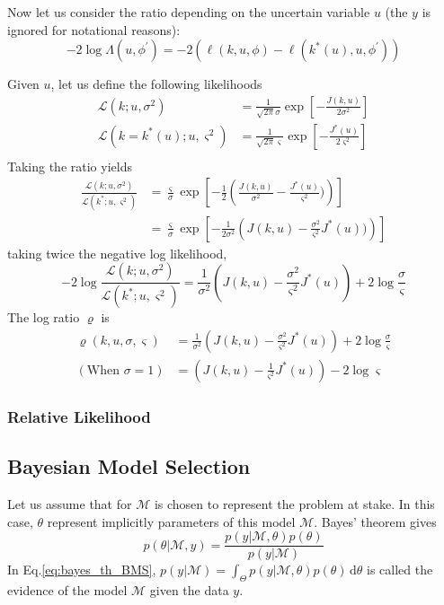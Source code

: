 \documentclass[a4paper,11pt]{article}
\theoremstyle{defi}
\numberwithin{thmCounter}{section}
\begin{document}
Now let us consider the ratio depending on the uncertain variable $u$ (the $y$ is ignored for notational reasons):
\begin{equation}
  -2\log\Lambda(u, \phi^\prime) = -2\left(\ell(k, u, \phi) - \ell(k^*(u), u, \phi^\prime) \right)
\end{equation}

Given $u$, let us define the following likelihoods
\begin{align}
  \mathcal{L}(k ; u, \sigma^2) &= \frac{1}{\sqrt{2\pi}\sigma}\exp\left[-\frac{J(k,u)}{2\sigma^2}\right] \\
  \mathcal{L}(k=k^*(u) ; u, \varsigma^2) &= \frac{1}{\sqrt{2\pi}\varsigma}\exp\left[-\frac{J^*(u)}{2\varsigma^2}\right] \\
\end{align}
Taking the ratio yields
\begin{align}
  \frac{\mathcal{L}(k;u,\sigma^2)}{\mathcal{L}(k^*;u,\varsigma^2)} &= \frac{\varsigma}{\sigma}\exp\left[-\frac{1}{2}\left(\frac{J(k,u)}{\sigma^2} - \frac{J^*(u)}{\varsigma^2})\right)\right] \\
                                                                   &= \frac{\varsigma}{\sigma}\exp\left[-\frac{1}{2\sigma^2}\left(J(k,u)- \frac{\sigma^2}{\varsigma^2}J^*(u))\right)\right]
\end{align}
taking twice the negative log likelihood,
\begin{equation}
  -2\log \frac{\mathcal{L}(k;u,\sigma^2)}{\mathcal{L}(k^*;u,\varsigma^2)} = \frac{1}{\sigma^2}\left(J(k,u) - \frac{\sigma^2}{\varsigma^2}J^*(u)\right) +2\log\frac{\sigma}{\varsigma}
\end{equation}
The log ratio $\varrho$ is
\begin{align}
  \varrho(k, u, \sigma, \varsigma) &= \frac{1}{\sigma^2}\left(J(k,u) - \frac{\sigma^2}{\varsigma^2}J^*(u)\right) +2\log\frac{\sigma}{\varsigma} \\
  (\text{When } \sigma=1)                  &  = \left(J(k,u) - \frac{1}{\varsigma^2}J^*(u)\right) - 2\log\varsigma
\end{align}


\subsubsection{Relative Likelihood}
\label{sec:relative_likelihood}
\subsection{Bayesian Model Selection}
\label{sec:bayesian_model_selection}
Let us assume that for $\mathcal{M}$ is chosen to represent the problem at stake. In this case, $\theta$ represent implicitly parameters of this model $\mathcal{M}$. Bayes' theorem gives
\begin{equation}
  \label{eq:bayes_th_BMS}
  p(\theta | \mathcal{M}, y) = \frac{p(y | \mathcal{M}, \theta)p(\theta)}{p(y | \mathcal{M})}
\end{equation}
In Eq.\eqref{eq:bayes_th_BMS}, $p(y | \mathcal{M}) = \int_{\Theta}p(y | \mathcal{M}, \theta)p(\theta) \,\mathrm{d}\theta$ is called the evidence of the model $\mathcal{M}$ given the data $y$.
\end{document}
